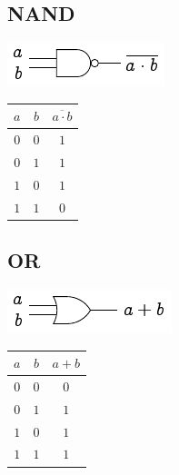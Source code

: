 \begin{multicols}{4}
	\subsection*{NAND}
	\begin{minipage}[t][2em][c]{\linewidth}
		\centering
		\includegraphics{fig.nand.pdf}
	\end{minipage}
	\begin{center}
		\begin{tabular}{cc|c}
			\toprule
			$a$ & $b$ & $\overline{a\cdot b}$ \\
			\midrule
			$0$ & $0$ & $1$                   \\
			$0$ & $1$ & $1$                   \\
			$1$ & $0$ & $1$                   \\
			$1$ & $1$ & $0$                   \\
			\bottomrule
		\end{tabular}
	\end{center}

	\columnbreak

	\subsection*{OR}
	\begin{minipage}[t][2em][c]{\linewidth}
		\centering
		\includegraphics{fig.or.pdf}
	\end{minipage}
	\begin{center}
		\begin{tabular}{cc|c}
			\toprule
			$a$ & $b$ & $a+b$ \\
			\midrule
			$0$ & $0$ & $0$   \\
			$0$ & $1$ & $1$   \\
			$1$ & $0$ & $1$   \\
			$1$ & $1$ & $1$   \\
			\bottomrule
		\end{tabular}
	\end{center}


\end{multicols}
